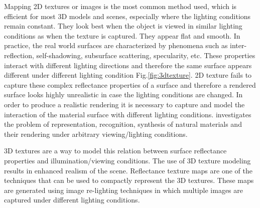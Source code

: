 
Mapping 2D textures or images is the most common method used, which is
efficient for most 3D models and scenes, especially where the lighting
conditions remain constant. They look best when the object is viewed in similar lighting conditions as
when the texture is captured. They appear flat and smooth.
In practice, the real world surfaces are
characterized by phenomena such as inter-reflection, self-shadowing, subsurface
scattering, specularity, etc. These properties interact with different lighting
directions and therefore the same surface appears different under
different lighting condition Fig.\ref{fig:3dtexture}. 2D texture fails to capture these complex reflectance properties of a 
surface and therefore a rendered surface looks highly unrealistic in case the lighting
conditions are changed. In order to produce a realistic rendering it is necessary to capture
and model the interaction of the material surface with different lighting
conditions. \cite{C1} investigates the problem of representation, recognition, synthesis of
natural materials and their rendering under arbitrary viewing/lighting conditions.






3D textures are a way to model this relation between surface reflectance
properties and illumination/viewing conditions.
The use of 3D texture modeling
results in enhanced realism of the scene. Reflectance texture maps are one of
the techniques that can be used to compactly represent the 3D textures. These
maps are generated using image re-lighting techniques \cite{C5,C4,C2} in which
multiple images are captured under different lighting conditions.


